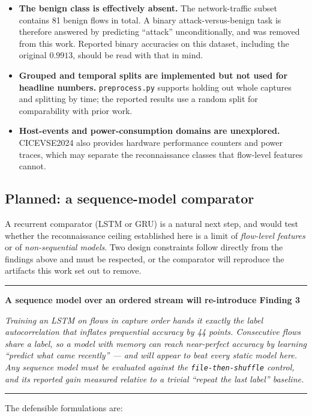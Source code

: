 \documentclass[11pt, a4paper]{article}
\newenvironment{tightitem}%
    {\begin{itemize}[leftmargin=1.4em, itemsep=0.3em]}{\end{itemize}}
\newenvironment{tightitem}{\begin{itemize}}{\end{itemize}}
\newenvironment{caution}[1]
    {\par\medskip\noindent\textcolor{alertred}{\rule{\textwidth}{1pt}}\par\nobreak
     \smallskip\noindent\textbf{\textcolor{alertred}{#1}}\par\nobreak\smallskip\itshape}
    {\par\smallskip\noindent\textcolor{alertred}{\rule{\textwidth}{1pt}}\par\medskip}
\newcommand{\col}[1]{\texttt{\small #1}}
\begin{document}
\begin{tightitem}
  \item \textbf{The benign class is effectively absent.} The network-traffic
        subset contains 81 benign flows in total. A binary attack-versus-benign
        task is therefore answered by predicting ``attack'' unconditionally, and
        was removed from this work. Reported binary accuracies on this dataset,
        including the original $0.9913$, should be read with that in mind.
  \item \textbf{Grouped and temporal splits are implemented but not used for
        headline numbers.} \col{preprocess.py} supports holding out whole
        captures and splitting by time; the reported results use a random split
        for comparability with prior work.
  \item \textbf{Host-events and power-consumption domains are unexplored.}
        CICEVSE2024 also provides hardware performance counters and power traces,
        which may separate the reconnaissance classes that flow-level features
        cannot.
\end{tightitem}

\subsection{Planned: a sequence-model comparator}

A recurrent comparator (LSTM or GRU) is a natural next step, and would test
whether the reconnaissance ceiling established here is a limit of \emph{flow-level
features} or of \emph{non-sequential models}. Two design constraints follow
directly from the findings above and must be respected, or the comparator will
reproduce the artifacts this work set out to remove.

\begin{caution}{A sequence model over an ordered stream will re-introduce Finding 3}
Training an LSTM on flows in capture order hands it exactly the label
autocorrelation that inflates prequential accuracy by 44 points. Consecutive
flows share a label, so a model with memory can reach near-perfect accuracy by
learning ``predict what came recently'' --- and will appear to beat every static
model here. Any sequence model must be evaluated against the
\texttt{file-then-shuffle} control, and its reported gain measured relative to a
trivial ``repeat the last label'' baseline.
\end{caution}

\noindent
The defensible formulations are:
\end{document}
